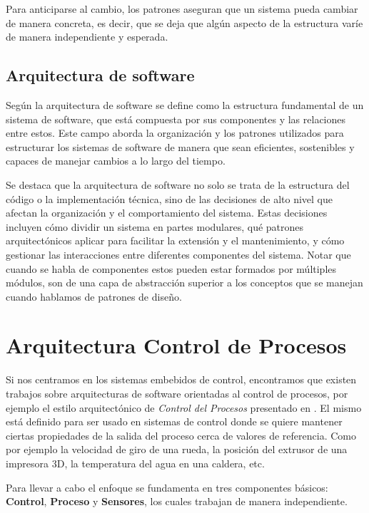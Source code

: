 Para anticiparse al cambio, los patrones aseguran que un sistema pueda cambiar de manera concreta, es decir, que se deja que algún aspecto de la estructura varíe de manera independiente y esperada.


\subsection{Arquitectura de software}

Según \cite{ShawGarlan1996} la arquitectura de software se define como la estructura fundamental de un sistema de software, que está compuesta por sus componentes y las relaciones entre estos. Este campo aborda la organización y los patrones utilizados para estructurar los sistemas de software de manera que sean eficientes, sostenibles y capaces de manejar cambios a lo largo del tiempo.

Se destaca que la arquitectura de software no solo se trata de la estructura del código o la implementación técnica, sino de las decisiones de alto nivel que afectan la organización y el comportamiento del sistema. Estas decisiones incluyen cómo dividir un sistema en partes modulares, qué patrones arquitectónicos aplicar para facilitar la extensión y el mantenimiento, y cómo gestionar las interacciones entre diferentes componentes del sistema. Notar que cuando se habla de componentes estos pueden estar formados por múltiples módulos, son de una capa de abstracción superior a los conceptos que se manejan cuando hablamos de patrones de diseño.


\section{Arquitectura Control de Procesos}

Si nos centramos en los sistemas embebidos de control, encontramos que existen trabajos sobre arquitecturas de software orientadas al control de procesos, por ejemplo el estilo arquitectónico de \textit{Control del Procesos} presentado en \cite{ShawGarlan1996}. El mismo está definido para ser usado en sistemas de control donde se quiere mantener ciertas propiedades de la salida del proceso cerca de valores de referencia. Como por ejemplo la velocidad de giro de una rueda, la posición del extrusor de una impresora 3D, la temperatura del agua en una caldera, etc.

Para llevar a cabo el enfoque se fundamenta en tres componentes básicos: \textbf{Control}, \textbf{Proceso} y \textbf{Sensores}, los cuales trabajan de manera independiente.

